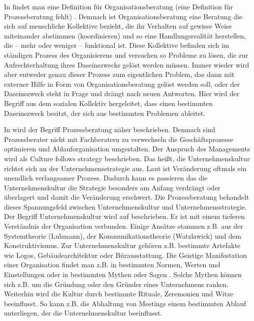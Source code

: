 In \cite[28]{MuellerNagel} findet man eine Definition für Organisationsberatung (eine Definition für Prozessberatung fehlt) . Demnach ist Organisationsberatung eine Beratung die \glqq  sich auf menschliche Kollektive bezieht, die ihr Verhalten auf gewisse Weise miteinander abstimmen (koordinieren) und so eine Handlungsrealität herstellen, die – mehr oder weniger – funktional ist. Diese Kollektive befinden sich im ständigen Prozess des Organisierens und versuchen so Probleme zu lösen, die zur Aufrechterhaltung ihres Daseinszwecks gelöst werden müssen. Immer wieder wird aber entweder genau dieser Prozess zum eigentlichen Problem, das dann mit externer Hilfe in Form von Organisationsberatung gelöst werden soll, oder der Daseinszweck steht in Frage und drängt nach neuen Antworten.
\grqq Hier wird der Begriff aus dem sozialen Kollektiv hergeleitet, dass einen bestimmten Daseinszweck besitzt, der sich aus bestimmten Problemen ableitet.

In \cite[9]{HBProzess} wird der Begriff Prozessberatung näher beschrieben. Demnach sind Prozessberater nicht mit Fachberatern zu verwechseln die Geschäftsprozesse optimieren und Ablauforganisation umgestalten. Der Anspruch des Managements wird als \glqq Culture follows strategy \grqq beschrieben. Das heißt, die Unternehmenskultur richtet sich an der Unternehmensstrategie aus. Laut \cite[9]{HBProzess} ist Veränderung oftmals ein unendlich verlangsamer Prozess. Dadurch kann es passieren das die Unternehmenskultur die Strategie besonders am Anfang verdrängt oder überlagert und damit die Veränderung erschwert. Die Prozessberatung behandelt dieses Spannungsfeld zwischen Unternehmenskultur und Unternehmensstrategie.
Der Begriff Unternehmenskultur wird auf \cite[ Seite 9]{HBProzess} beschrieben. Er ist mit einem tieferen Verständnis der Organisation verbunden. Einige
Ansätze stammen z.B. aus der Systemtheorie (Luhmann), der Kommunikationstheorie (Watzlawick) und dem Konstruktivismus. Zur Unternehmenskultur gehören z.B. bestimmte Artefakte wie Logos, Gebäudearchitektur oder Bürausstattung. Die Geistige Manifestation einer Organisation findet man z.B. in bestimmten Normen, Werten und Einstellungen oder in bestimmten \glqq Mythen oder Sagen \grqq. Solche Mythen können sich z.B. um die Gründung oder den Gründer eines Unternehmens ranken. Weiterhin wird die Kultur durch bestimmte Rituale, Zeremonien und Witze beeinflusst. So kann z.B. die Abhaltung von Meetings einem bestimmten Ablauf unterliegen, der die Unternehmenskultur beeinflusst.

